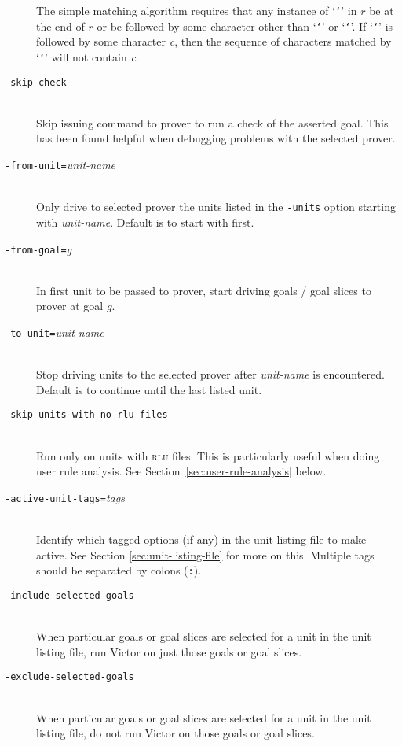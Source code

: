 \documentclass[12pt,fleqn]{article}
\newcommand{\rlu}{\textsc{rlu}}
\newcommand{\ttstar}{{\tt \char`\*}}
\newcommand{\ttqmark}{{\tt \char`\?}}
\newcommand{\optionb}[1]{\item[\texttt{-{#1}}]\ \\}
\newcommand{\optionv}[2]{\item[\texttt{-{#1}=}\mdseries\textit{#2}]\ \\}
\begin{document}
\begin{description}
  The simple matching algorithm requires that any instance of
  `\ttstar{}' in $r$ be at the end of $r$ or be followed by some
  character other than `\ttstar{}' or `\ttqmark'.  If `\ttstar' is
  followed by some character \emph{c}, then the sequence of characters
  matched by `\ttstar' will not contain \emph{c}.

\optionb{skip-check} 
  Skip issuing command to prover to run a check of the asserted goal.
  This has been found helpful when debugging problems with the selected
  prover.

\optionv{from-unit}{unit-name}
  Only drive to selected prover the units listed in the \texttt{-units} option
  starting with \textit{unit-name}.  Default is to start with first. 

\optionv{from-goal}{g}
  In first unit to be passed to prover, start driving goals / goal
  slices to prover at goal $g$.

\optionv{to-unit}{unit-name}
  Stop driving units to the selected prover after \textit{unit-name} is 
  encountered. Default is to continue until the last listed unit.

\optionb{skip-units-with-no-rlu-files} 
   Run only on units with \rlu{} files.   This is particularly
   useful when doing user rule analysis.   
    See Section~\ref{sec:user-rule-analysis} below.



\optionv{active-unit-tags}{tags}
  Identify which tagged options (if any) in the unit listing file to make
  active.  See Section \ref{sec:unit-listing-file} for more on this.
  Multiple tags should be separated by colons (\texttt{:}).

\optionb{include-selected-goals}
  When particular goals or goal slices are selected for a unit in the
  unit listing file, run Victor on just those goals or goal slices.

\optionb{exclude-selected-goals}
  When particular goals or goal slices are selected for a unit in the
  unit listing file, do not run Victor on those goals or goal slices.

\end{description}


\end{document}
